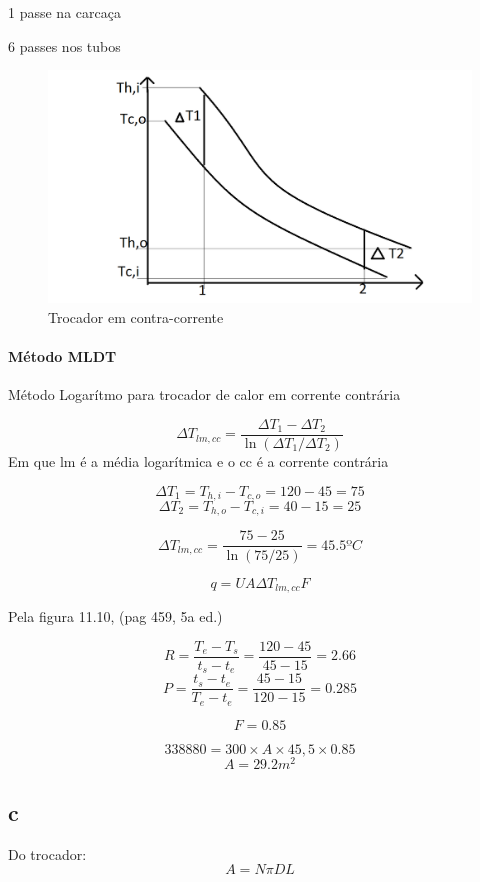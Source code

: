 \documentclass[a4paper, 12pt]{article}
\begin{document}
1 passe na carcaça

6 passes nos tubos

\begin{figure}[h]
\begin{center}
\includegraphics[scale=0.28]{./fig/2.png}
\caption{\label{fig:2}Trocador em contra-corrente} 
\end{center}
\end{figure}

\paragraph{Método MLDT}
Método Logarítmo para trocador de calor em corrente contrária

\[\Delta T_{lm,cc}=\frac{\Delta T_{1}-\Delta T_{2}}{\ln(\Delta T_{1}/\Delta T_{2})}\]
Em que lm é a média logarítmica e o cc é a corrente contrária

\[\Delta T_{1} = T_{h,i} - T_{c,o} = 120 - 45 = 75\]
\[\Delta T_{2} = T_{h,o} - T_{c,i} = 40 - 15 = 25\]

\[\Delta T_{lm,cc} = \frac{75-25}{\ln(75/25)}=45.5ºC\]

\[q = UA \Delta T_{lm,cc} F\]

Pela figura 11.10, (pag 459, 5a ed.)

\[R = \frac{T_{e}-T_{s}}{t_{s}-t_{e}} = \frac{120-45}{45-15}=2.66\]
\[P = \frac{t_{s}-t_{e}}{T_{e}-t_{e}} = \frac{45-15}{120-15}=0.285\]

\[F = 0.85\]

\[338880=300 \times A \times 45,5 \times 0.85\]
\[A = 29.2 m^{2}\]

\subsection{c}
Do trocador:
\[A = N \pi D L \]
\end{document}
